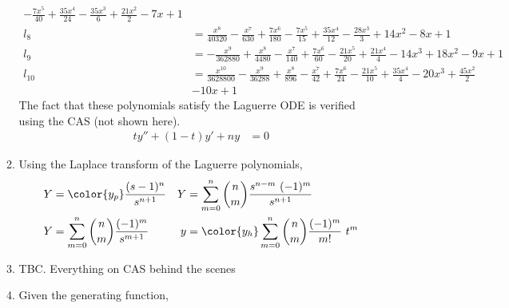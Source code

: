 \begin{enumerate}
\begin{enumerate}
\begin{align}
                        - \frac{7 x^{5}}{40} + \frac{35 x^{4}}{24} - \frac{35 x^{3}}{6}
                        + \frac{21 x^{2}}{2} - 7 x + 1                             \\
                        l_8    & = \frac{x^{8}}{40320} - \frac{x^{7}}{630}
                        + \frac{7 x^{6}}{180} - \frac{7 x^{5}}{15} + \frac{35 x^{4}}{12}
                        - \frac{28 x^{3}}{3} + 14 x^{2} - 8 x + 1                  \\
                        l_9    & = - \frac{x^{9}}{362880} + \frac{x^{8}}{4480}
                        - \frac{x^{7}}{140} + \frac{7 x^{6}}{60} - \frac{21 x^{5}}{20}
                        + \frac{21 x^{4}}{4} - 14 x^{3} + 18 x^{2} - 9 x + 1       \\
                        l_{10} & = \frac{x^{10}}{3628800} - \frac{x^{9}}{36288}
                        + \frac{x^{8}}{896} - \frac{x^{7}}{42} + \frac{7 x^{6}}{24}
                        - \frac{21 x^{5}}{10} + \frac{35 x^{4}}{4} - 20 x^{3}
                        + \frac{45 x^{2}}{2}                                       \\
                               & - 10 x + 1
                    \end{align}
                    The fact that these polynomials satisfy the Laguerre ODE is verified
                    using the CAS (not shown here).
                    \begin{align}
                        ty'' + (1 - t)y' + ny & = 0
                    \end{align}
              \item Using the Laplace transform of the Laguerre polynomials,
                    \begin{align}
                        Y & = \color{y_p} \frac{(s-1)^n}{s^{n+1}}                    &
                        Y & = \sum_{m = 0}^{n} \binom{n}{m} \frac{s^{n-m}\ (-1)^{m}}
                        {s^{n+1}}                                                      \\
                        Y & = \sum_{m = 0}^{n} \binom{n}{m} \frac{(-1)^m}{s^{m+1}}   &
                        y & = \color{y_h} \sum_{m = 0}^{n} \binom{n}{m}
                        \frac{(-1)^m}{m!}\ t^m
                    \end{align}
              \item TBC. Everything on CAS behind the scenes
              \item Given the generating function,
                    \begin{align}

\end{align}
\end{enumerate}
\end{enumerate}
